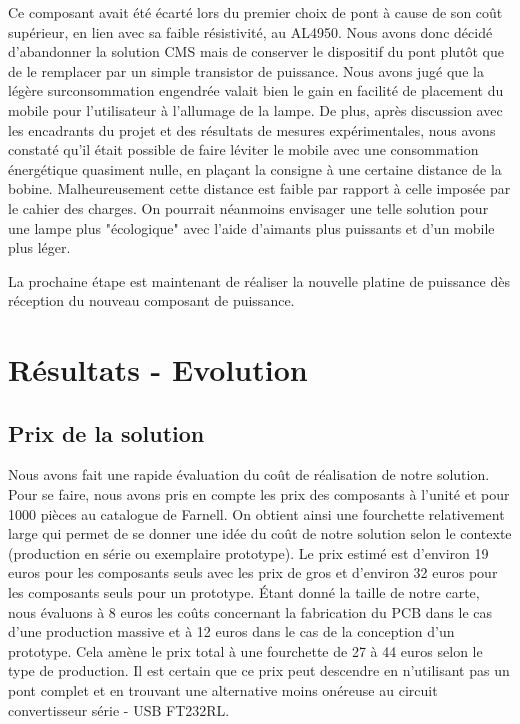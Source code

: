 \documentclass[11pt, french]{article} %
\begin{document}
Ce composant avait été écarté lors du premier choix de pont à cause de son coût supérieur, en lien avec sa faible résistivité, au AL4950. Nous avons donc décidé d'abandonner la solution CMS mais de conserver le dispositif du pont plutôt que de le remplacer par un simple transistor de puissance. Nous avons jugé que la légère surconsommation engendrée valait bien le gain en facilité de placement du mobile pour l'utilisateur à l'allumage de la lampe. De plus, après discussion avec les encadrants du projet et des résultats de mesures expérimentales, nous avons constaté qu'il était possible de faire léviter le mobile avec une consommation énergétique quasiment nulle, en plaçant la consigne à une certaine distance de la bobine. Malheureusement cette distance est faible par rapport à celle imposée par le cahier des charges. On pourrait néanmoins envisager une telle solution pour une lampe plus "écologique" avec l'aide d'aimants plus puissants et d'un mobile plus léger.

\medskip
La prochaine étape est maintenant de réaliser la nouvelle platine de puissance dès réception du nouveau composant de puissance.

\section{Résultats - Evolution}

\subsection{Prix de la solution}
Nous avons fait une rapide évaluation du coût de réalisation de notre solution. Pour se faire, nous avons pris en compte les prix des composants à l'unité et pour 1000 pièces au catalogue de Farnell. On obtient ainsi une fourchette relativement large qui permet de se donner une idée du coût de notre solution selon le contexte (production en série ou exemplaire prototype). Le prix estimé est d'environ 19 euros pour les composants seuls avec les prix de gros et d'environ 32 euros pour les composants seuls pour un prototype. Étant donné la taille de notre carte, nous évaluons à 8 euros les coûts concernant la fabrication du PCB dans le cas d'une production massive et à 12 euros dans le cas de la conception d'un prototype. Cela amène le prix total à une fourchette de 27 à 44 euros selon le type de production. Il est certain que ce prix peut descendre en n'utilisant pas un pont complet et en trouvant une alternative moins onéreuse au circuit convertisseur série - USB FT232RL. 
 
\end{document}
